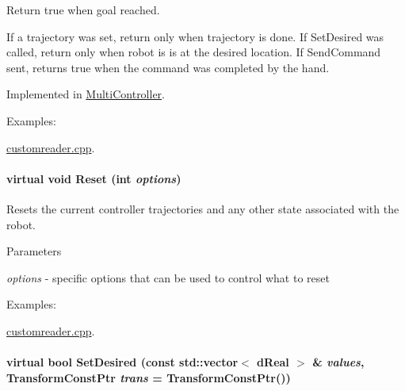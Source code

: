 Return true when goal reached. 

If a trajectory was set, return only when trajectory is done. If SetDesired was called, return only when robot is is at the desired location. If SendCommand sent, returns true when the command was completed by the hand. 

Implemented in \hyperlink{classOpenRAVE_1_1MultiController_a223430ff4833c832a9689262eeb6a509}{MultiController}.

\begin{Desc}
\item[Examples: ]\par
\hyperlink{customreader_8cpp-example}{customreader.cpp}.\end{Desc}
\hypertarget{classOpenRAVE_1_1ControllerBase_aa495f583f5f0b3b3c412f730fdf8d715}{
\paragraph[{Reset}]{\setlength{\rightskip}{0pt plus 5cm}virtual void Reset (int {\em options})}\hfill}
\label{classOpenRAVE_1_1ControllerBase_aa495f583f5f0b3b3c412f730fdf8d715}


Resets the current controller trajectories and any other state associated with the robot. 


\begin{DoxyParams}{Parameters}
\item[{\em options}]-\/ specific options that can be used to control what to reset \end{DoxyParams}
\begin{Desc}
\item[Examples: ]\par
\hyperlink{customreader_8cpp-example}{customreader.cpp}.\end{Desc}
\hypertarget{classOpenRAVE_1_1ControllerBase_accd34e8fe0dfb473777ab4668bf7a5d9}{
\paragraph[{SetDesired}]{\setlength{\rightskip}{0pt plus 5cm}virtual bool SetDesired (const std::vector$<$ dReal $>$ \& {\em values}, \/  TransformConstPtr {\em trans} = {\ttfamily TransformConstPtr()})}\hfill}
\label{classOpenRAVE_1_1ControllerBase_accd34e8fe0dfb473777ab4668bf7a5d9}


